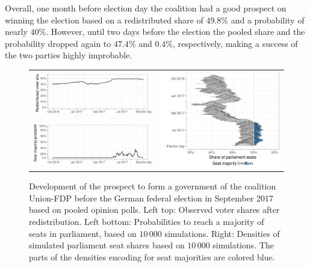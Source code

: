 \documentclass[smallcondensed]{svjour3}     %
\begin{document}
Overall, one month before election day the coalition had a good prospect
on winning the election based on a redistributed share of $49.8\%$ and
a probability of nearly $40\%$.
However, until two days before the election the pooled share and the probability
dropped again to $47.4\%$ and $0.4\%$, respectively, making a success
of the two parties highly improbable.

\begin{figure}[H]\centering
\begin{tabular}{ll}
\includegraphics[height=.15\textwidth]{figures/2017_pooled_cdufdp_rawSharesRedist.pdf}
&
\multirow{2}{*}[13ex]{\includegraphics[height=30ex]{figures/2017_pooled_cdufdp_ridgeline.pdf}}
\\
\includegraphics[height=.15\textwidth]{figures/2017_pooled_cdufdp_prob.pdf}
\end{tabular}
\caption{Development of the prospect to form a government of the coalition Union-FDP before the German federal election in September 2017 based on pooled opinion polls.
Left top: Observed voter shares after redistribution. Left bottom: Probabilities to reach a majority of seats in parliament, based on $10\,000$ simulations. Right: Densities of simulated parliament seat shares based on $10\,000$ simulations. The parts of the densities encoding for seat majorities are colored blue.
\label{fig:2017_cdufdp}
}
\end{figure}
\end{document}
